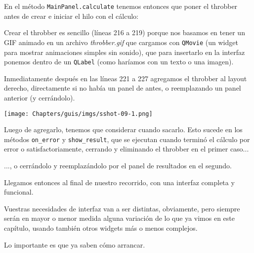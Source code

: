 En el método \texttt{MainPanel.calculate} tenemos entonces que poner el throbber antes de crear e iniciar el hilo con el cálculo:


Crear el throbber es sencillo (líneas 216 a 219) porque nos basamos en tener un GIF animado en un archivo \textit{throbber.gif} que cargamos con \texttt{QMovie} (un widget para mostrar animaciones simples sin sonido), que para insertarlo en la interfaz ponemos dentro de un \texttt{QLabel} (como haríamos con un texto o una imagen).

Inmediatamente después en las líneas 221 a 227 agregamos el throbber al layout derecho, directamente si no había un panel de antes, o reemplazando un panel anterior (y cerrándolo).

\begin{center}
    \texttt{[image: Chapters/guis/imgs/sshot-09-1.png]}
\end{center}

Luego de agregarlo, tenemos que considerar cuando sacarlo. Esto sucede en los métodos \texttt{on\_error} y \texttt{show\_result}, que se ejecutan cuando terminó el cálculo por error o satisfactoriamente, cerrando y eliminando el throbber en el primer caso...


..., o cerrándolo y reemplazándolo por el panel de resultados en el segundo.


Llegamos entonces al final de nuestro recorrido, con una interfaz completa y funcional.

Vuestras necesidades de interfaz van a ser distintas, obviamente, pero siempre serán en mayor o menor medida alguna variación de lo que ya vimos en este capítulo, usando también otros widgets más o menos complejos. 

Lo importante es que ya saben cómo arrancar.
